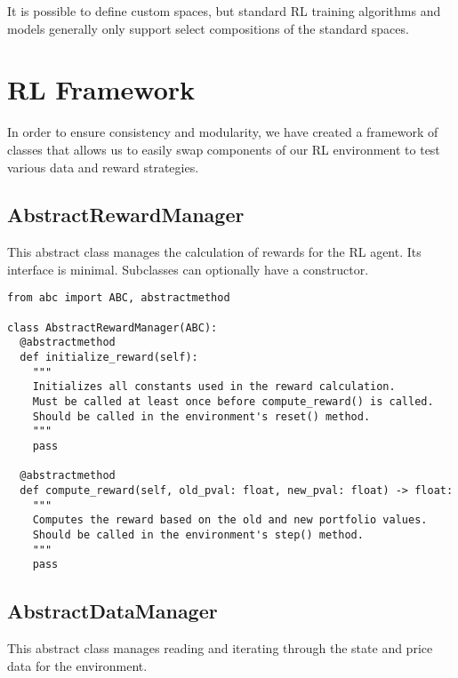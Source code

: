 It is possible to define custom spaces, but standard RL training algorithms and models
generally only support select compositions of the standard spaces.

\section{RL Framework}

In order to ensure consistency and modularity, we have created a framework of classes
that allows us to easily swap components of our RL environment to test various data
and reward strategies.

\subsection{AbstractRewardManager}

This abstract class manages the calculation of rewards for the RL agent.
Its interface is minimal. Subclasses can optionally have a constructor.

\begin{verbatim}
from abc import ABC, abstractmethod

class AbstractRewardManager(ABC):
  @abstractmethod
  def initialize_reward(self):
    """
    Initializes all constants used in the reward calculation.
    Must be called at least once before compute_reward() is called.
    Should be called in the environment's reset() method.
    """
    pass

  @abstractmethod
  def compute_reward(self, old_pval: float, new_pval: float) -> float:
    """
    Computes the reward based on the old and new portfolio values.
    Should be called in the environment's step() method.
    """
    pass
\end{verbatim}


\subsection{AbstractDataManager}

This abstract class manages reading and iterating through the state and price data for the environment.

